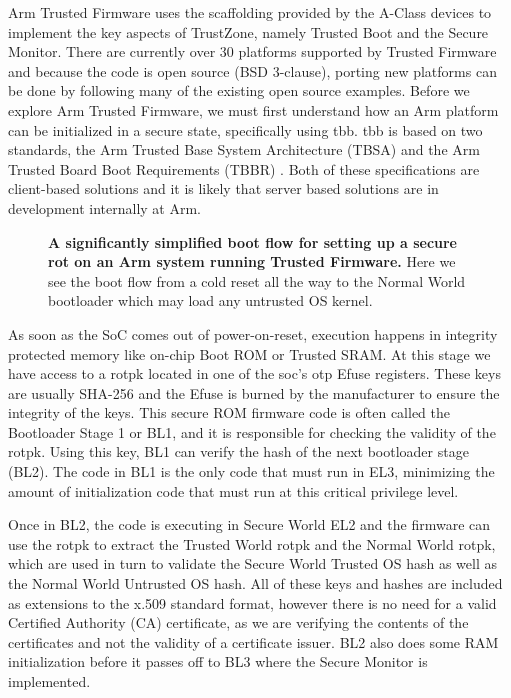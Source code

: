 Arm Trusted Firmware uses the scaffolding provided by the A-Class devices to implement the key aspects of TrustZone, namely Trusted Boot and the Secure Monitor. There are currently over 30 platforms supported by Trusted Firmware and because the code is open source (BSD 3-clause), porting new platforms can be done by following many of the existing open source examples. Before we explore Arm Trusted Firmware, we must first understand how an Arm platform can be initialized in a secure state, specifically using \gls{tbb}. \gls{tbb} is based on two standards, the Arm Trusted Base System Architecture (TBSA) \cite{Edition2018} and the Arm Trusted Board Boot Requirements (TBBR) \cite{ArmTrustedBoot}. Both of these specifications are client-based solutions and it is likely that server based solutions are in development internally at Arm.

\begin{figure}[ht]
\centering

\caption[Arm's Trusted Board Boot]{\textbf{A significantly simplified boot flow for setting up a secure \gls{rot} on an Arm system running Trusted Firmware.} Here we see the boot flow from a cold reset all the way to the Normal World bootloader which may load any untrusted OS kernel.}
\label{fig:tbb-flow}
\end{figure}

As soon as the SoC comes out of power-on-reset, execution happens in integrity protected memory like on-chip Boot ROM or Trusted SRAM. At this stage we have access to a \gls{rotpk} located in one of the \gls{soc}'s \gls{otp} Efuse registers. These keys are usually SHA-256 and the Efuse is burned by the manufacturer to ensure the integrity of the keys. This secure ROM firmware code is often called the Bootloader Stage 1 or BL1, and it is responsible for checking the validity of the \gls{rotpk}. Using this key, BL1 can verify the hash of the next bootloader stage (BL2). The code in BL1 is the only code that must run in EL3, minimizing the amount of initialization code that must run at this critical privilege level.

Once in BL2, the code is executing in Secure World EL2 and the firmware can use the \gls{rotpk} to extract the Trusted World \gls{rotpk} and the Normal World \gls{rotpk}, which are used in turn to validate the Secure World Trusted OS hash as well as the Normal World Untrusted OS hash. All of these keys and hashes are included as extensions to the x.509 standard format, however there is no need for a valid Certified Authority (CA) certificate, as we are verifying the contents of the certificates and not the validity of a certificate issuer. BL2 also does some RAM initialization before it passes off to BL3 where the Secure Monitor is implemented.

